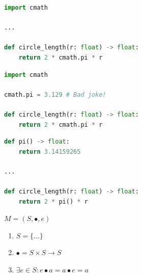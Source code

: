 \documentclass[aspectratio=169]{beamer}
\begin{document}
\begin{frame}[fragile,t]
    \begin{lstlisting}[language=Python]
import cmath

...

def circle_length(r: float) -> float:
    return 2 * cmath.pi * r
    \end{lstlisting}
\end{frame}

\begin{frame}[fragile,t]
    \begin{lstlisting}[language=Python]
import cmath

cmath.pi = 3.129 # Bad joke!

def circle_length(r: float) -> float:
    return 2 * cmath.pi * r
    \end{lstlisting}
\end{frame}

\begin{frame}[fragile,t]
    \begin{lstlisting}[language=Python]
def pi() -> float:
    return 3.14159265

...

def circle_length(r: float) -> float:
    return 2 * pi() * r
    \end{lstlisting}
\end{frame}

\begin{frame}
    \centering
\end{frame}

\begin{frame}
    \centering
        \Huge
            $M = (S, \bullet, e)$
\end{frame}

\begin{frame}
    \Huge
        \begin{enumerate}[ leftmargin=1.5em
                         , itemsep=1em
                         , labelsep=0.5em
                         , label=\color{darkelectricblue}\Roman*
                         ]
            \item $S = \{...\}$
            \item $\bullet = S \times S \to S$
            \item $\exists e \in S: e \bullet a = a \bullet e = a$
        \end{enumerate}
\end{frame}
\end{document}
